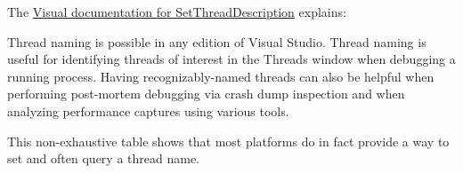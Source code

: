 \documentclass{wg21}
\begin{document}
The \href{https://docs.microsoft.com/en-us/visualstudio/debugger/how-to-set-a-thread-name-in-native-code?view=vs-2019}{Visual documentation for SetThreadDescription} explains:

\begin{quoteblock}
Thread naming is possible in any edition of Visual Studio. Thread naming is useful for identifying threads of interest in the Threads window when debugging a running process. Having recognizably-named threads can also be helpful when performing post-mortem debugging via crash dump inspection and when analyzing performance captures using various tools.
\end{quoteblock}

This non-exhaustive table shows that most platforms do in fact provide a way to set and often query a thread name.
\end{document}
